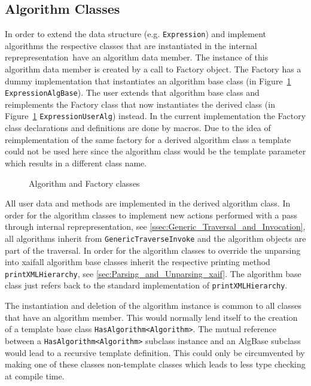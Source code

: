 \documentclass{book}
\newcommand{\InternalRep}{internal reprepresentation}
\newcommand{\xaif}{xaif}
\newcommand{\printXMLHierarchy}{{\tt printXMLHierarchy}}
\begin{document}
\subsection{Algorithm Classes}
\label{ssec:Algorithm_Classes}
In order to extend the data structure (e.g. {\tt Expression}) and implement algorithms 
the respective classes 
that are instantiated in the \InternalRep\ have an algorithm data member.
The instance of this algorithm data member is created by a call to Factory object. The Factory
has a dummy implementation that instantiates an algorithm base class (in 
Figure~\ref{fig:Algorithm_Classes} {\tt ExpressionAlgBase}).
The user extends that algorithm base class and reimplements the Factory class 
that now instantiates the derived class (in 
Figure~\ref{fig:Algorithm_Classes} {\tt ExpressionUserAlg}) instead. 
In the 
current implementation the Factory class declarations and definitions are done 
by macros. 
Due to the idea of reimplementation of the same factory for a 
derived algorithm class a template could not be used here since the algorithm 
class would be the template parameter which results in a different class name. 
\begin{figure}
\caption{Algorithm and Factory classes}
\label{fig:Algorithm_Classes}
\end{figure}
All user data and methods are implemented in the derived algorithm class. 
In order for the algorithm classes to implement new actions performed with a 
pass through \InternalRep, see \ref{ssec:Generic_Traversal_and_Invocation}, all 
algorithms inherit from {\tt GenericTraverseInvoke} and the algorithm objects 
are part of the traversal.
In order for the algorithm classes to override the unparsing into \xaif all 
algorithm base classes inherit the respective printing method \printXMLHierarchy, 
see \ref{sec:Parsing_and_Unparsing_xaif}.
The algorithm base class just refers back to the standard implementation of 
\printXMLHierarchy.

The instantiation and deletion of the algorithm instance is common to all 
classes that have an algorithm member. This would normally lend itself to the 
creation of a template base class {\tt HasAlgorithm<Algorithm>}. The mutual reference between 
a {\tt HasAlgorithm<Algorithm>} subclass instance and an AlgBase subclass would lead to 
a recursive template definition. This could only be circumvented by making one of these 
classes non-template classes which leads to less type checking at compile time. 
\end{document}
